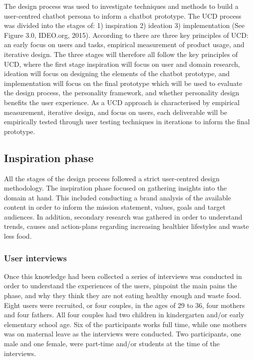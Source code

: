 The design process was used to investigate techniques and methods to build a user-centred chatbot persona to inform a chatbot prototype. The UCD process was divided into the stages of:  1) inspiration 2) ideation 3) implementation (See Figure 3.0, IDEO.org, 2015). According to \cite{Gould1985} there are three key principles of UCD: an early focus on users and tasks, empirical measurement of product usage, and iterative design. The three stages will therefore all follow the key principles of UCD, where the first stage inspiration will focus on user and domain research, ideation will focus on designing the elements of the chatbot prototype, and implementation will focus on the final prototype which will be used to evaluate the design process, the personality framework, and whether personality design benefits the user experience. As a UCD approach is characterised by empirical measurement, iterative design, and focus on users, each deliverable will be empirically tested through user testing techniques in iterations to inform the final prototype.


\vspace{5mm} %

\subsection{Inspiration phase}

All the stages of the design process followed a strict user-centred design methodology. The inspiration phase focused on gathering insights into the domain at hand. This included conducting a brand analysis of the available content in order to inform the mission statement, values, goals and target audiences. In addition, secondary research was gathered in order to understand trends, causes and action-plans regarding increasing healthier lifestyles and waste less food.

    \subsubsection{User interviews}
    
    Once this knowledge had been collected a series of interviews was conducted in order to understand the experiences of the users, pinpoint the main pains the phase, and why they think they are not eating healthy enough and waste food. Eight users were recruited, or four couples, in the ages of 29 to 36, four mothers and four fathers. All four couples had two children in kindergarten and/or early elementary school age. Six of the participants works full time, while one mothers was on maternal leave as the interviews were conducted. Two participants, one male and one female, were part-time and/or students at the time of the interviews.
    

